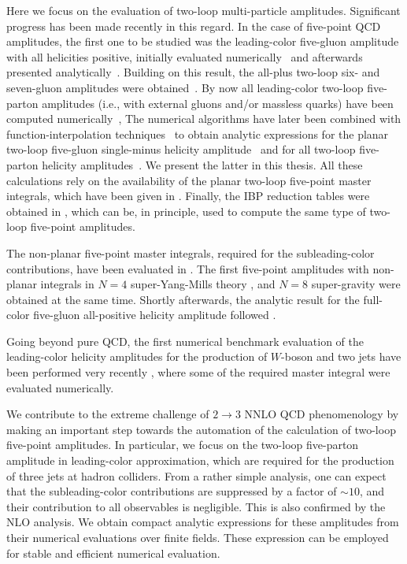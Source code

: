 Here we focus on the evaluation of two-loop multi-particle amplitudes.
Significant progress has been made recently in this regard.
In the case of five-point QCD amplitudes, the first one to be studied
was the leading-color five-gluon amplitude with all helicities positive, initially
evaluated numerically~\cite{Badger:2013gxa} and  
afterwards presented analytically~\cite{Gehrmann:2015bfy,Dunbar:2016aux}.
Building on this result, the all-plus two-loop six- and seven-gluon amplitudes were
obtained~\cite{Dunbar:2016gjb,Dunbar:2017nfy}.
By now all leading-color
two-loop five-parton amplitudes (i.e., with external gluons and/or
massless quarks) have been computed
numerically~\cite{Badger:2017jhb, Abreu:2017hqn, Badger:2018gip, Abreu:2018jgq},
The numerical algorithms have later been combined with
function-interpolation techniques~\cite{Peraro:2019svx,Peraro:2016wsq,Klappert:2019emp} to obtain
analytic expressions for the planar two-loop five-gluon single-minus helicity
amplitude~\cite{Badger:2018enw} and for all two-loop five-parton helicity
amplitudes~\cite{Abreu:2018zmy,Abreu:2019odu}.
We present the latter in this thesis.
All these calculations rely on the availability of the planar two-loop five-point master
integrals, which have been given in \cite{Papadopoulos:2015jft,Gehrmann:2018yef}. 
Finally, the IBP reduction tables were obtained in \cite{Boels:2018nrr,Chawdhry:2018awn}, which can be, in principle, used to compute the
same type of two-loop five-point amplitudes.

The non-planar five-point master integrals, required for the subleading-color contributions,
have been evaluated in \cite{Abreu:2018aqd,Chicherin:2018old}.
The first five-point amplitudes with non-planar integrals in $N=4$ super-Yang-Mills theory \cite{Chicherin:2018yne,Abreu:2018aqd},
and $N=8$ super-gravity \cite{Chicherin:2019xeg,Abreu:2019rpt}
were obtained at the same time.
Shortly afterwards, the analytic result for the full-color five-gluon all-positive helicity amplitude
followed \cite{Badger:2019djh}.

Going beyond pure QCD, the first numerical benchmark evaluation of the leading-color helicity amplitudes for the production of $W$-boson and two jets 
have been performed very recently \cite{Hartanto:2019uvl}, where some of the required master integral were evaluated numerically.

We contribute to the extreme challenge of $2\to 3$ NNLO QCD phenomenology by
making an important step towards the automation of the calculation of two-loop five-point amplitudes.
In particular, we focus on the two-loop five-parton amplitude in leading-color approximation,
which are required for the production of three jets at hadron colliders.
From a rather simple analysis, one can expect that the subleading-color contributions are suppressed by a factor of $\sim 10$,
and their contribution to all observables is negligible.
This is also confirmed by the NLO analysis.
We obtain compact analytic expressions for these amplitudes from their numerical evaluations over finite fields.
These expression can be employed for stable and efficient numerical evaluation.

